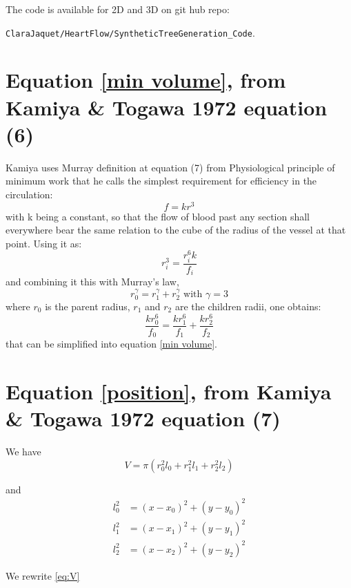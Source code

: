 \documentclass[a4paper, 11pt]{article} %
\newcommand{\sqlen}[1]{\ensuremath{(x - x_{#1})^2 + (y-y_{#1})^2}}
\begin{document}
The code is available for 2D and 3D on git hub repo:

 \verb|ClaraJaquet/HeartFlow/SyntheticTreeGeneration_Code|.

\clearpage


\begin{appendices}
\section{Equation \eqref{min volume}, from Kamiya \& Togawa 1972 equation  (6)}\label{appendix:1}
Kamiya uses Murray definition at equation (7) from Physiological principle of minimum work \cite{murray1926physiological} that he calls the simplest requirement for efficiency in the circulation:
\begin{equation*}
f = k r^3
\end{equation*}
with k being a constant, so that the flow of blood past any section shall everywhere bear the same relation to the cube of the radius of the vessel at that point. Using it as:
\begin{equation*}
r_i^3 = \frac{r_i^6 k}{f_i}
\end{equation*}
and combining it this with Murray's law,
\begin{equation*}
r_0^\gamma = r_1^\gamma + r_2^\gamma \text{ with } \gamma = 3
\end{equation*}
 where $r_0$ is the parent radius, $r_1$ and $r_2$ are the children radii, one obtains:
\begin{equation*}
\frac{k r_0^6}{f_0} = \frac{k r_1^6}{f_1} + \frac{k r_2^6}{f_2}
\end{equation*}
that can be simplified into equation \eqref{min volume}.


\section{Equation \eqref{position}, from Kamiya \& Togawa 1972 equation  (7) }\label{appendix:2}

We have
\begin{equation*}
\label{eq:V}
V = \pi(r_0^2 l_0 + r_1^2 l_1 + r_2^2 l_2)
\end{equation*}

and
\begin{align*}
l_0^2 &= \sqlen{0} \\
l_1^2 &= \sqlen{1} \\
l_2^2 &= \sqlen{2} 
\end{align*}

We rewrite \eqref{eq:V}


\end{appendices}
\end{document}
